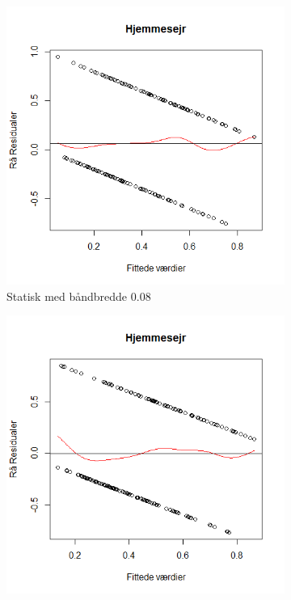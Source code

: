 \documentclass[11pt,a4paper]{article}
\begin{document}
\begin{figure}[h!]
  \centering
  \begin{subfigure}[b]{0.425\linewidth}
    \includegraphics[width=\linewidth]{ResSHS.png}
    \caption{Statisk med båndbredde 0.08}
    \label{fig:ResSHS}
  \end{subfigure}
  \begin{subfigure}[b]{0.425\linewidth}
    \includegraphics[width=\linewidth]{ResDHS.png}

\end{subfigure}
\end{figure}
\end{document}
